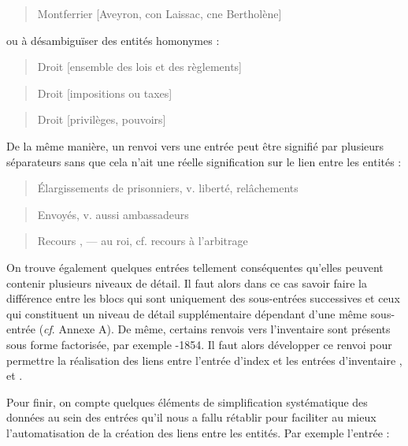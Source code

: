 \documentclass[a4paper,12pt,twoside]{book}
\begin{document}
	\begin{quotation}
		Montferrier [Aveyron, con Laissac, cne Bertholène]
	\end{quotation}

	\noindent ou à désambiguïser des entités homonymes :

	\begin{quotation}
		Droit [ensemble des lois et des règlements]
	\end{quotation}

	\begin{quotation}
		Droit [impositions ou taxes]
	\end{quotation}

	\begin{quotation}
		Droit [privilèges, pouvoirs]
	\end{quotation}
	
	De la même manière, un renvoi vers une entrée peut être signifié par plusieurs séparateurs sans que cela n'ait une réelle signification sur le lien entre les entités :
	
	\begin{quotation}
		Élargissements de prisonniers, v. liberté, relâchements
	\end{quotation}

	\begin{quotation}
		Envoyés, v. aussi ambassadeurs
	\end{quotation}

	\begin{quotation}
		Recours , — au roi, cf. recours à l'arbitrage
	\end{quotation}
	
	On trouve également quelques entrées tellement conséquentes qu'elles peuvent contenir plusieurs niveaux de détail. Il faut alors dans ce cas savoir faire la différence entre les blocs qui sont uniquement des sous-entrées successives et ceux qui constituent un niveau de détail supplémentaire dépendant d'une même sous-entrée (\textit{cf}. Annexe A). De même, certains renvois vers l'inventaire sont présents sous forme factorisée, par exemple -1854\fg{}. Il faut alors développer ce renvoi pour permettre la réalisation des liens entre l'entrée d'index et les entrées d'inventaire \fg{}, \fg{} et \fg{}.
	
	Pour finir, on compte quelques éléments de simplification systématique des données au sein des entrées qu'il nous a fallu rétablir pour faciliter au mieux l'automatisation de la création des liens entre les entités. Par exemple l'entrée :
	
\end{document}
